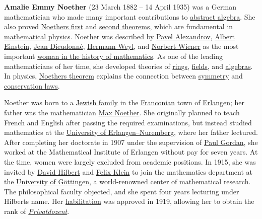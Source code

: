 \textbf{Amalie Emmy Noether} (23 March 1882 -- 14 April 1935) was a German mathematician who made many important contributions to \href{https://en.wikipedia.org/wiki/Abstract_algebra}{abstract algebra}. She also proved \href{https://en.wikipedia.org/wiki/Noether's_theorem}{Noether\textquotesingle s first} and \href{https://en.wikipedia.org/wiki/Noether's_second_theorem}{second theorems}, which are fundamental in \href{https://en.wikipedia.org/wiki/Mathematical_physics}{mathematical physics}. Noether was described by \href{https://en.wikipedia.org/wiki/Pavel_Alexandrov}{Pavel Alexandrov}, \href{https://en.wikipedia.org/wiki/Albert_Einstein}{Albert Einstein}, \href{https://en.wikipedia.org/wiki/Jean_Dieudonné}{Jean Dieudonné}, \href{https://en.wikipedia.org/wiki/Hermann_Weyl}{Hermann Weyl}, and \href{https://en.wikipedia.org/wiki/Norbert_Wiener}{Norbert Wiener} as the most important \href{https://en.wikipedia.org/wiki/List_of_women_in_mathematics}{woman in the history of mathematics}. As one of the leading mathematicians of her time, she developed theories of \href{https://en.wikipedia.org/wiki/Ring_(mathematics)}{rings}, \href{https://en.wikipedia.org/wiki/Field_(mathematics)}{fields}, and \href{https://en.wikipedia.org/wiki/Algebras}{algebras}. In physics, \href{https://en.wikipedia.org/wiki/Noether's_theorem}{Noether\textquotesingle s theorem} explains the connection between \href{https://en.wikipedia.org/wiki/Symmetry_(physics)}{symmetry} and \href{https://en.wikipedia.org/wiki/Conservation_law}{conservation laws}.

Noether was born to a \href{https://en.wikipedia.org/wiki/Jewish_family}{Jewish family} in the \href{https://en.wikipedia.org/wiki/Franconia}{Franconian} town of \href{https://en.wikipedia.org/wiki/Erlangen}{Erlangen}; her father was the mathematician \href{https://en.wikipedia.org/wiki/Max_Noether}{Max Noether}. She originally planned to teach French and English after passing the required examinations, but instead studied mathematics at the \href{https://en.wikipedia.org/wiki/University_of_Erlangen–Nuremberg}{University of Erlangen--Nuremberg}, where her father lectured. After completing her doctorate in 1907 under the supervision of \href{https://en.wikipedia.org/wiki/Paul_Gordan}{Paul Gordan}, she worked at the Mathematical Institute of Erlangen without pay for seven years. At the time, women were largely excluded from academic positions. In 1915, she was invited by \href{https://en.wikipedia.org/wiki/David_Hilbert}{David Hilbert} and \href{https://en.wikipedia.org/wiki/Felix_Klein}{Felix Klein} to join the mathematics department at the \href{https://en.wikipedia.org/wiki/University_of_Göttingen}{University of Göttingen}, a world-renowned center of mathematical research. The philosophical faculty objected, and she spent four years lecturing under Hilbert\textquotesingle s name. Her \href{https://en.wikipedia.org/wiki/Habilitation}{habilitation} was approved in 1919, allowing her to obtain the rank of \emph{\href{https://en.wikipedia.org/wiki/Privatdozent}{Privatdozent}}.

